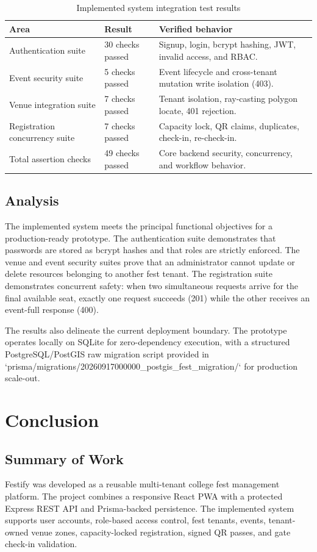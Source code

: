 \documentclass[11pt,a4paper]{report}
\begin{document}
\begin{table}[ht]
\centering
\caption{Implemented system integration test results}
\label{tab:results}
\begin{tabular}{p{5.1cm}p{2.4cm}p{4.9cm}}
\toprule
\textbf{Area} & \textbf{Result} & \textbf{Verified behavior}\\
\midrule
Authentication suite & 30 checks passed & Signup, login, bcrypt hashing, JWT, invalid access, and RBAC.\\
Event security suite & 5 checks passed & Event lifecycle and cross-tenant mutation write isolation (403).\\
Venue integration suite & 7 checks passed & Tenant isolation, ray-casting polygon locate, 401 rejection.\\
Registration concurrency suite & 7 checks passed & Capacity lock, QR claims, duplicates, check-in, re-check-in.\\
Total assertion checks & 49 checks passed & Core backend security, concurrency, and workflow behavior.\\
\bottomrule
\end{tabular}
\end{table}

\section{Analysis}
The implemented system meets the principal functional objectives for a production-ready prototype. The authentication suite demonstrates that passwords are stored as bcrypt hashes and that roles are strictly enforced. The venue and event security suites prove that an administrator cannot update or delete resources belonging to another fest tenant. The registration suite demonstrates concurrent safety: when two simultaneous requests arrive for the final available seat, exactly one request succeeds (201) while the other receives an event-full response (400).

The results also delineate the current deployment boundary. The prototype operates locally on SQLite for zero-dependency execution, with a structured PostgreSQL/PostGIS raw migration script provided in `prisma/migrations/20260917000000_postgis_fest_migration/` for production scale-out.

\chapter{Conclusion}
\section{Summary of Work}
Festify was developed as a reusable multi-tenant college fest management platform. The project combines a responsive React PWA with a protected Express REST API and Prisma-backed persistence. The implemented system supports user accounts, role-based access control, fest tenants, events, tenant-owned venue zones, capacity-locked registration, signed QR passes, and gate check-in validation.
\end{document}
